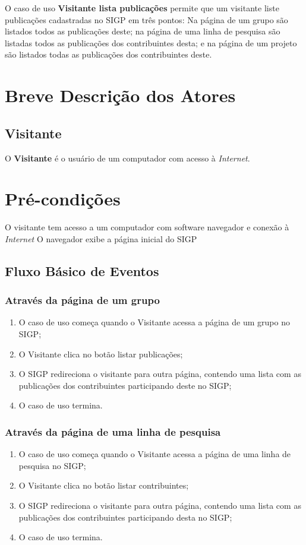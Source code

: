 \documentclass[11pt, a4paper,oneside]{book}
\begin{document}
O caso de uso \textbf{Visitante lista publicações} permite que um visitante liste publicações cadastradas no SIGP em três pontos: Na página de um grupo são listados todos as publicações deste; na página de uma linha de pesquisa são listadas todos as publicações dos contribuintes desta; e na página de um projeto são listados todas as publicações dos contribuintes deste.

\section{Breve Descrição dos Atores}

\subsection{Visitante}

O \textbf{Visitante} é o usuário de um computador com acesso à \emph{Internet}.

\section{Pré-condições}
O visitante tem acesso a um computador com software navegador e conexão à \emph{Internet}
O navegador exibe a página inicial do SIGP

\subsection{Fluxo Básico de Eventos}

\subsubsection{Através da página de um grupo}
\begin{enumerate}
\item O caso de uso começa quando o Visitante acessa a página de um grupo no SIGP;
\item O Visitante clica no botão listar publicações;
\item O SIGP redireciona o visitante para outra página, contendo uma lista com as publicações dos contribuintes participando deste no SIGP;
\item O caso de uso termina.
\end{enumerate}

\subsubsection{Através da página de uma linha de pesquisa}
\begin{enumerate}
\item O caso de uso começa quando o Visitante acessa a página de uma linha de pesquisa no SIGP;
\item O Visitante clica no botão listar contribuintes;
\item O SIGP redireciona o visitante para outra página, contendo uma lista com as publicações dos contribuintes participando desta no SIGP;
\item O caso de uso termina.
\end{enumerate}
\end{document}
